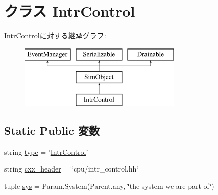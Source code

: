 \hypertarget{classIntrControl_1_1IntrControl}{
\section{クラス IntrControl}
\label{classIntrControl_1_1IntrControl}
}
IntrControlに対する継承グラフ:\begin{figure}[H]
\begin{center}
\leavevmode
\includegraphics[height=3cm]{classIntrControl_1_1IntrControl}
\end{center}
\end{figure}
\subsection*{Static Public 変数}
\begin{DoxyCompactItemize}
\item 
string \hyperlink{classIntrControl_1_1IntrControl_acce15679d830831b0bbe8ebc2a60b2ca}{type} = '\hyperlink{classIntrControl_1_1IntrControl}{IntrControl}'
\item 
string \hyperlink{classIntrControl_1_1IntrControl_a17da7064bc5c518791f0c891eff05fda}{cxx\_\-header} = \char`\"{}cpu/intr\_\-control.hh\char`\"{}
\item 
tuple \hyperlink{classIntrControl_1_1IntrControl_a1f27497e90bf86cc0b513e5c086c9e19}{sys} = Param.System(Parent.any, \char`\"{}the system we are part of\char`\"{})
\end{DoxyCompactItemize}


